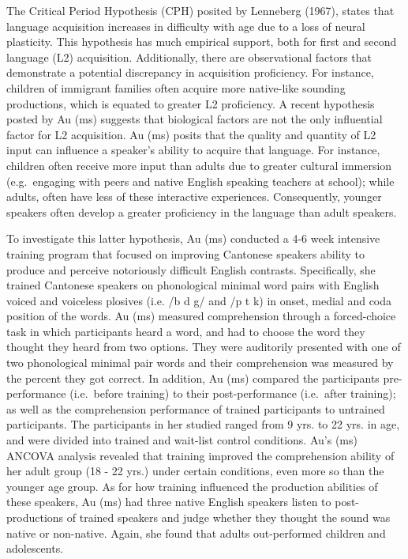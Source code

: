 \documentclass[man]{apa6}
\theoremstyle{definition}
\theoremstyle{definition}
\theoremstyle{definition}
\theoremstyle{remark}
\begin{document}
The Critical Period Hypothesis (CPH) posited by Lenneberg (1967), states
that language acquisition increases in difficulty with age due to a loss
of neural plasticity. This hypothesis has much empirical support, both
for first and second language (L2) acquisition. Additionally, there are
observational factors that demonstrate a potential discrepancy in
acquisition proficiency. For instance, children of immigrant families
often acquire more native-like sounding productions, which is equated to
greater L2 proficiency. A recent hypothesis posted by Au (ms) suggests
that biological factors are not the only influential factor for L2
acquisition. Au (ms) posits that the quality and quantity of L2 input
can influence a speaker's ability to acquire that language. For
instance, children often receive more input than adults due to greater
cultural immersion (e.g.~engaging with peers and native English speaking
teachers at school); while adults, often have less of these interactive
experiences. Consequently, younger speakers often develop a greater
proficiency in the language than adult speakers.

To investigate this latter hypothesis, Au (ms) conducted a 4-6 week
intensive training program that focused on improving Cantonese speakers
ability to produce and perceive notoriously difficult English contrasts.
Specifically, she trained Cantonese speakers on phonological minimal
word pairs with English voiced and voiceless plosives (i.e. /b d g/ and
/p t k) in onset, medial and coda position of the words. Au (ms)
measured comprehension through a forced-choice task in which
participants heard a word, and had to choose the word they thought they
heard from two options. They were auditorily presented with one of two
phonological minimal pair words and their comprehension was measured by
the percent they got correct. In addition, Au (ms) compared the
participants pre-performance (i.e.~before training) to their
post-performance (i.e.~after training); as well as the comprehension
performance of trained participants to untrained participants. The
participants in her studied ranged from 9 yrs. to 22 yrs. in age, and
were divided into trained and wait-list control conditions. Au's (ms)
ANCOVA analysis revealed that training improved the comprehension
ability of her adult group (18 - 22 yrs.) under certain conditions, even
more so than the younger age group. As for how training influenced the
production abilities of these speakers, Au (ms) had three native English
speakers listen to post-productions of trained speakers and judge
whether they thought the sound was native or non-native. Again, she
found that adults out-performed children and adolescents.
\end{document}
